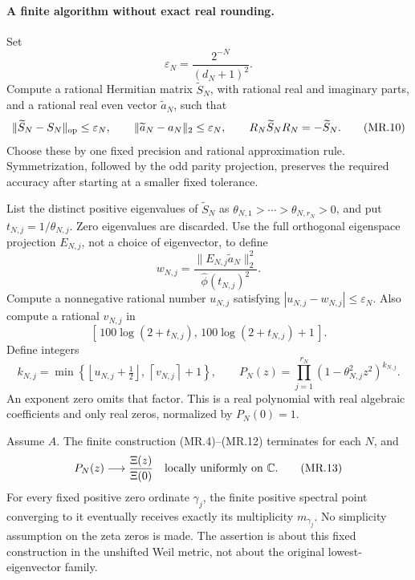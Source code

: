 \paragraph{A finite algorithm without exact real rounding.}
Set
\[
 \varepsilon_N=\frac{2^{-N}}{(d_N+1)^2}.
 \tag{MR.9}
\]
Compute a rational Hermitian matrix \(\widetilde S_N\), with
rational real and imaginary parts, and a rational real even
vector \(\widetilde a_N\), such that
\[
 \|\widetilde S_N-S_N\|_{\rm op}\le\varepsilon_N,\qquad
 \|\widetilde a_N-a_N\|_2\le\varepsilon_N,\qquad
 R_N\widetilde S_NR_N=-\widetilde S_N .
 \tag{MR.10}
\]
Choose these by one fixed precision and rational approximation
rule.  Symmetrization, followed by the odd parity projection,
preserves the required accuracy after starting at a smaller
fixed tolerance.

List the distinct positive eigenvalues of \(\widetilde S_N\) as
\(\theta_{N,1}>\cdots>\theta_{N,r_N}>0\), and put
\(t_{N,j}=1/\theta_{N,j}\).  Zero eigenvalues are discarded.
Use the full orthogonal eigenspace projection
\(E_{N,j}\), not a choice of eigenvector, to define
\[
 w_{N,j}=
 \frac{\|E_{N,j}\widetilde a_N\|_2^2}
      {\widehat\phi(t_{N,j})^2}.
 \tag{MR.11}
\]
Compute a nonnegative rational number \(u_{N,j}\) satisfying
\(|u_{N,j}-w_{N,j}|\le\varepsilon_N\).
Also compute a rational \(v_{N,j}\) in
\[
 [\,100\log(2+t_{N,j}),\,100\log(2+t_{N,j})+1\,].
\]
Define integers
\[
 k_{N,j}=\min\left\{
       \left\lfloor u_{N,j}+\tfrac12\right\rfloor,\,
       \left\lceil v_{N,j}\right\rceil+1
                 \right\},
 \qquad
 P_N(z)=\prod_{j=1}^{r_N}
             (1-\theta_{N,j}^2z^2)^{k_{N,j}} .
 \tag{MR.12}
\]
An exponent zero omits that factor.  This is a real polynomial
with real algebraic coefficients and only real zeros, normalized
by \(P_N(0)=1\).

\begin{theorem}
\label{AC-S50}
Assume \(A\).  The finite construction
(MR.4)--(MR.12) terminates for each \(N\), and
\[
                 P_N(z)\longrightarrow\frac{\Xi(z)}{\Xi(0)}
            \quad\hbox{locally uniformly on }\mathbb C .
 \tag{MR.13}
\]
For every fixed positive zero ordinate \(\gamma_j\), the finite
positive spectral point converging to it eventually receives
exactly its multiplicity \(m_{\gamma_j}\).
No simplicity assumption on the zeta zeros is made.
The assertion is about this fixed construction in the unshifted
Weil metric, not about the original lowest-eigenvector family.
\end{theorem}

